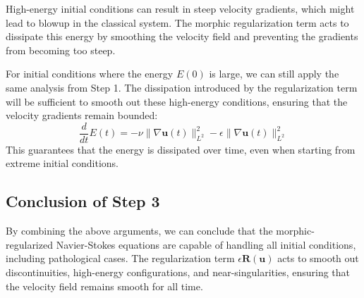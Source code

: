 \documentclass{article}
\begin{document}
High-energy initial conditions can result in steep velocity gradients, which might lead to blowup in the classical system. The morphic regularization term acts to dissipate this energy by smoothing the velocity field and preventing the gradients from becoming too steep. 

For initial conditions where the energy \( E(0) \) is large, we can still apply the same analysis from Step 1. The dissipation introduced by the regularization term will be sufficient to smooth out these high-energy conditions, ensuring that the velocity gradients remain bounded:
\[
\frac{d}{dt} E(t) = -\nu \|\nabla \mathbf{u}(t)\|_{L^2}^2 - \epsilon \|\nabla \mathbf{u}(t)\|_{L^2}^2
\]
This guarantees that the energy is dissipated over time, even when starting from extreme initial conditions.

\subsection*{Conclusion of Step 3}

By combining the above arguments, we can conclude that the morphic-regularized Navier-Stokes equations are capable of handling all initial conditions, including pathological cases. The regularization term \( \epsilon \mathbf{R}(\mathbf{u}) \) acts to smooth out discontinuities, high-energy configurations, and near-singularities, ensuring that the velocity field remains smooth for all time.
\end{document}
